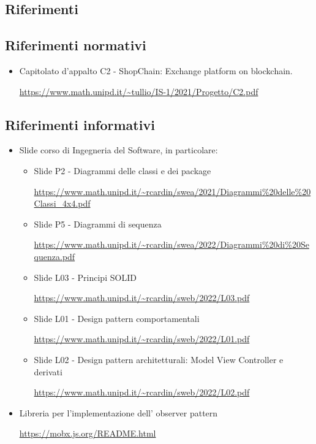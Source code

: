 \subsection{Riferimenti}
\subsection{Riferimenti normativi}
\begin{itemize}
    \item Capitolato d'appalto C2 - ShopChain: Exchange platform on blockchain.
    \begin{center}
       \url{https://www.math.unipd.it/~tullio/IS-1/2021/Progetto/C2.pdf}
    \end{center} 
\end{itemize}

\subsection{Riferimenti informativi}
\begin{itemize}
    \item Slide corso di Ingegneria del Software, in particolare:
    \begin{itemize}
        \item Slide P2 - Diagrammi delle classi e dei package
        \begin{center}
            \url{https://www.math.unipd.it/~rcardin/swea/2021/Diagrammi%20delle%20Classi_4x4.pdf}
        \end{center}
        \item Slide P5 - Diagrammi di sequenza
        \begin{center}
            \url{https://www.math.unipd.it/~rcardin/swea/2022/Diagrammi%20di%20Sequenza.pdf}
        \end{center}
        \item Slide L03 - Principi SOLID
        \begin{center}
            \url{https://www.math.unipd.it/~rcardin/sweb/2022/L03.pdf}
        \end{center}
        \item Slide L01 - Design pattern comportamentali
        \begin{center}
            \url{https://www.math.unipd.it/~rcardin/sweb/2022/L01.pdf}
        \end{center}
        \item Slide L02 - Design pattern architetturali: Model View Controller e derivati
        \begin{center}
            \url{https://www.math.unipd.it/~rcardin/sweb/2022/L02.pdf}
        \end{center}    
        \end{itemize}
    \item Libreria per l'implementazione dell' observer pattern
    \begin{center}
        \url{https://mobx.js.org/README.html}
    \end{center}
\end{itemize}    